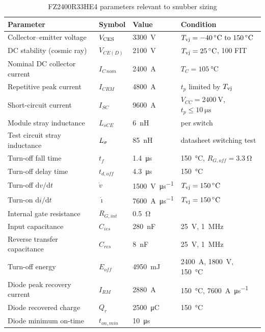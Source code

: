 \begin{table}[htbp]
\centering
\caption{FZ2400R33HE4 parameters relevant to snubber sizing}
\label{snubber:tab:device}
\begin{tabular}{llll}
\toprule
Parameter & Symbol & Value & Condition \\
\midrule
Collector--emitter voltage      & $V_{\mathrm{CES}}$        & \SI{3300}{\volt}   & $\Tvj = \SIrange{-40}{150}{\celsius}$ \\
DC stability (cosmic ray)       & $V_{CE(D)}$    & \SI{2100}{\volt}   & $T_{\mathrm{vj}} = \SI{25}{\celsius}$, 100 FIT \\
Nominal DC collector current    & $I_{C\,nom}$   & \SI{2400}{\ampere} & $T_C = \SI{105}{\celsius}$ \\
Repetitive peak current         & $I_{CRM}$      & \SI{4800}{\ampere} & $t_p$ limited by $T_{\mathrm{vj}}$ \\
Short-circuit current           & $I_{SC}$       & \SI{9600}{\ampere} & $V_{CC}=\SI{2400}{\volt}$, $t_p\le\SI{10}{\micro\second}$ \\
Module stray inductance         & $L_{sCE}$      & \SI{6}{\nano\henry} & per switch \\
Test circuit stray inductance   & $L_{\sigma}$          & \SI{85}{\nano\henry} & datasheet switching test \\
Turn-off fall time              & $t_f$          & \SI{1.4}{\micro\second} & \SI{150}{\celsius}, $R_{G,off}=\SI{3.3}{\ohm}$ \\
Turn-off delay time             & $t_{d,off}$    & \SI{4.3}{\micro\second} & \SI{150}{\celsius} \\
Turn-off $\mathrm{d}v/\mathrm{d}t$        & $\dot v$       & \SI{1500}{\volt\per\micro\second} & $T_{\mathrm{vj}} = \SI{150}{\celsius}$ \\
Turn-on $\mathrm{d}i/\mathrm{d}t$         & $\dot\imath$   & \SI{7600}{\ampere\per\micro\second} & $T_{\mathrm{vj}} = \SI{150}{\celsius}$ \\
Internal gate resistance        & $R_{G,int}$    & \SI{0.5}{\ohm} & \\
Input capacitance               & $C_{ies}$      & \SI{280}{\nano\farad} & \SI{25}{\volt}, \SI{1}{\mega\hertz} \\
Reverse transfer capacitance    & $C_{res}$      & \SI{8}{\nano\farad} & \SI{25}{\volt}, \SI{1}{\mega\hertz} \\
Turn-off energy                 & $E_{off}$      & \SI{4950}{\milli\joule} & \SI{2400}{\ampere}, \SI{1800}{\volt}, \SI{150}{\celsius} \\
Diode peak recovery current     & $I_{RM}$       & \SI{2880}{\ampere} & \SI{150}{\celsius}, \SI{7600}{\ampere\per\micro\second} \\
Diode recovered charge          & $Q_r$          & \SI{2500}{\micro\coulomb} & \SI{150}{\celsius} \\
Diode minimum on-time           & $t_{on,min}$   & \SI{10}{\micro\second} & \\
\bottomrule
\end{tabular}
\end{table}

